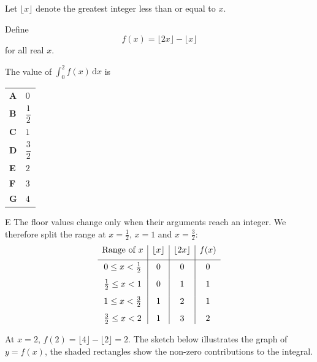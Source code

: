 \documentclass[11pt,a4paper]{article}
\begin{document}
\begin{enumerate}[label=\textbf{\arabic*.},leftmargin=*,itemsep=0pt,start=9]
\questionitem[Integration]
Let $\lfloor x\rfloor$ denote the greatest integer less than or equal to $x$.

Define \[ f(x)=\lfloor 2x\rfloor-\lfloor x\rfloor \] for all real $x$.

The value of $\displaystyle \int_0^2 f(x)\,\mathrm{d}x$ is

\par\vspace*{12pt}
\begin{tabularx}{\linewidth}{@{}>{\bfseries}l Y@{}}
A &
$0$
\\[0.8em]
B &
$\dfrac{1}{2}$
\\[0.8em]
C &
$1$
\\[0.8em]
D &
$\dfrac{3}{2}$
\\[0.8em]
E &
$2$
\\[0.8em]
F &
$3$
\\[0.8em]
G &
$4$
\\
\end{tabularx}

\begin{djsSolution}{E}
The floor values change only when their arguments reach an integer. We therefore split the range at $x=\frac12$, $x=1$ and $x=\frac32$:
\[
\begin{array}{c|c|c|c}
\text{Range of }x & \lfloor x\rfloor & \lfloor2x\rfloor & f(x)\\[5pt]
\hline
\rule{0pt}{2.5ex}0\leq x<\frac12 & 0 & 0 & 0\\[8pt]
\frac12\leq x<1 & 0 & 1 & 1\\[8pt]
1\leq x<\frac32 & 1 & 2 & 1\\[8pt]
\frac32\leq x<2 & 1 & 3 & 2
\end{array}
\]

At $x=2$, $f(2)=\lfloor4\rfloor-\lfloor2\rfloor=2$. The sketch below illustrates the graph of $y=f(x)$, the shaded rectangles show the non-zero contributions to the integral.

\begin{djsSolutionFigure}
\end{djsSolutionFigure}
\end{djsSolution}
\end{enumerate}
\end{document}
